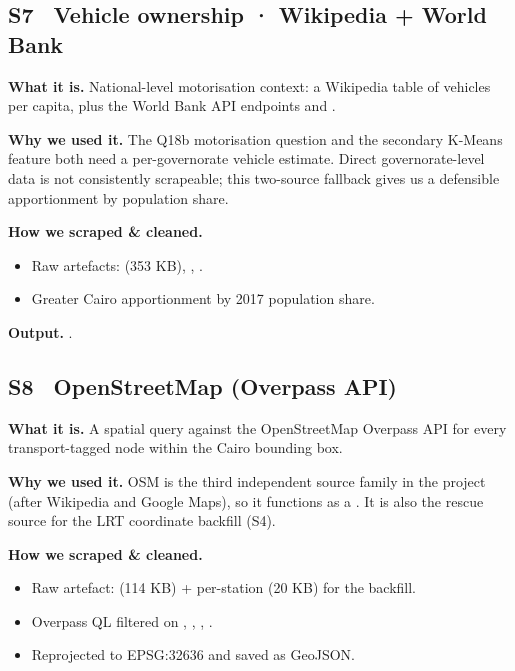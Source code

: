 
\subsection{S7 \textbullet\ Vehicle ownership · Wikipedia + World Bank}

\textbf{What it is.} National-level motorisation context: a Wikipedia
table of vehicles per capita, plus the World Bank API endpoints
 and .

\textbf{Why we used it.} The Q18b motorisation question and the
secondary K-Means feature both need a per-governorate vehicle
estimate. Direct governorate-level data is not consistently scrapeable;
this two-source fallback gives us a defensible apportionment by
population share.

\textbf{How we scraped \& cleaned.}
\begin{itemize}
 \item Raw artefacts: 
 (353 KB), ,
 .
 \item Greater Cairo apportionment by 2017 population share.
\end{itemize}

\textbf{Output.} .

\subsection{S8 \textbullet\ OpenStreetMap (Overpass API)}

\textbf{What it is.} A spatial query against the OpenStreetMap
Overpass API for every transport-tagged node within the Cairo bounding
box.

\textbf{Why we used it.} OSM is the third independent source family in
the project (after Wikipedia and Google Maps), so it functions as a
. It is also the rescue source for the
LRT coordinate backfill (S4).

\textbf{How we scraped \& cleaned.}
\begin{itemize}
 \item Raw artefact:  (114 KB) +
 per-station  (20 KB) for the
 backfill.
 \item Overpass QL filtered on , ,
 , .
 \item Reprojected to EPSG:32636 and saved as GeoJSON.
\end{itemize}

